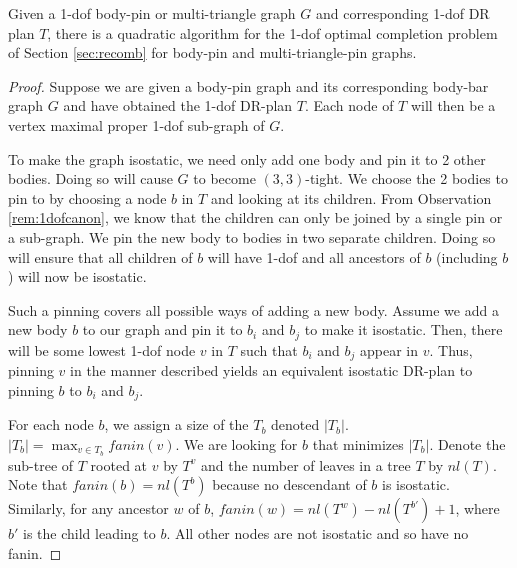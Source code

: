 \begin{figure}
\end{figure}

\begin{theorem}
\label{thm:1dofcase}
    Given a 1-dof body-pin or multi-triangle graph $G$ and corresponding 1-dof DR plan $T$, there is a quadratic algorithm for the 1-dof optimal completion problem of Section \ref{sec:recomb} for body-pin and multi-triangle-pin graphs.
\end{theorem}

\begin{proof}
    Suppose we are given a body-pin graph and its corresponding body-bar graph $G$ and have obtained the 1-dof DR-plan $T$. Each node of $T$ will then be a vertex maximal proper 1-dof sub-graph of $G$. 

    To make the graph isostatic, we need only add one body and pin it to 2 other bodies. Doing so will cause $G$ to become $(3,3)$-tight. We choose the 2 bodies to pin to by choosing a node $b$ in $T$ and looking at its children. From Observation \ref{rem:1dofcanon}, we know that the children can only be joined by a single pin or a sub-graph. We pin the new body to bodies in two separate children. Doing so will ensure that all children of $b$ will have 1-dof and all ancestors of $b$ (including $b$) will now be isostatic. 

    
    Such a pinning covers all possible ways of adding a new body. Assume we add a new body $b$ to our graph and pin it to $b_i$ and $b_j$ to make it isostatic. Then, there will be some lowest 1-dof node $v$ in $T$ such that $b_i$ and $b_j$ appear in $v$. Thus, pinning $v$ in the manner described yields an equivalent isostatic DR-plan to pinning $b$ to $b_i$ and $b_j$. 

    For each node $b$, we assign a size of the $T_b$ denoted $|T_b|$. $|T_b| = \displaystyle\max_{v \in T_b} fanin(v)$. We are looking for $b$ that minimizes $|T_b|$. Denote the sub-tree of $T$ rooted at $v$ by $T^v$ and the number of leaves in a tree $T$ by $nl(T)$. Note that $fanin(b)= nl(T^b)$ because no descendant of $b$ is isostatic. Similarly, for any ancestor $w$ of $b$, $fanin(w) = nl(T^w)-nl(T^{b'})+1$, where $b'$ is the child leading to $b$. All other nodes are not isostatic and so have no fanin.


\end{proof}
